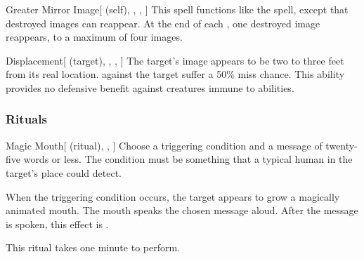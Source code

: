 \lowercase{\hypertarget{spell:Greater Mirror Image}{}}\label{spell:Greater Mirror Image}
\begin{attuneability}[Rank 5]{\hypertarget{spell:Greater Mirror Image}{Greater Mirror Image}}[ (self), , , ]
This spell functions like the  spell, except that destroyed images can reappear.
At the end of each , one destroyed image reappears, to a maximum of four images.
\end{attuneability}
\vspace{0.25em}



\lowercase{\hypertarget{spell:Displacement}{}}\label{spell:Displacement}
\begin{attuneability}[Rank 7]{\hypertarget{spell:Displacement}{Displacement}}[ (target), , , ]
The target's image appears to be two to three feet from its real location.
  against the target suffer a 50\% miss chance.
This ability provides no defensive benefit against creatures immune to  abilities.
\end{attuneability}
\vspace{0.25em}



\subsubsection{Rituals}


\lowercase{\hypertarget{spell:Magic Mouth}{}}\label{spell:Magic Mouth}
\begin{attuneability}[Rank 1]{\hypertarget{spell:Magic Mouth}{Magic Mouth}}[ (ritual), , ]
Choose a triggering condition and a message of twenty-five words or less.
The condition must be something that a typical human in the target's place could detect.

When the triggering condition occurs, the target appears to grow a magically animated mouth.
The mouth speaks the chosen message aloud.
After the message is spoken, this effect is .

This ritual takes one minute to perform.
\end{attuneability}
\vspace{0.25em}


